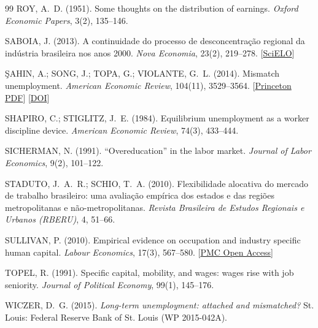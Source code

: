 \documentclass[11pt,a4paper]{article}
\begin{document}
{\begin{thebibliography}{99}
ROY, A.~D. (1951). Some thoughts on the distribution of earnings. \textit{Oxford Economic Papers}, 3(2), 135--146.

SABOIA, J. (2013). A continuidade do processo de desconcentra\c{c}\~ao regional da ind\'ustria brasileira nos anos 2000. \textit{Nova Economia}, 23(2), 219--278. [\href{https://doi.org/10.1590/S0103-63512013000200001}{SciELO}]

\c{S}AHIN, A.; SONG, J.; TOPA, G.; VIOLANTE, G.~L. (2014). Mismatch unemployment. \textit{American Economic Review}, 104(11), 3529--3564. [\href{https://oar.princeton.edu/rt4ds/file/13928/mismatch+u.pdf}{Princeton PDF}] [\href{https://doi.org/10.1257/aer.104.11.3529}{DOI}]

SHAPIRO, C.; STIGLITZ, J.~E. (1984). Equilibrium unemployment as a worker discipline device. \textit{American Economic Review}, 74(3), 433--444.

SICHERMAN, N. (1991). ``Overeducation'' in the labor market. \textit{Journal of Labor Economics}, 9(2), 101--122.

STADUTO, J.~A.~R.; SCHIO, T.~A. (2010). Flexibilidade alocativa do mercado de trabalho brasileiro: uma avalia\c{c}\~ao emp\'irica dos estados e das regi\~oes metropolitanas e n\~ao-metropolitanas. \textit{Revista Brasileira de Estudos Regionais e Urbanos (RBERU)}, 4, 51--66.

SULLIVAN, P. (2010). Empirical evidence on occupation and industry specific human capital. \textit{Labour Economics}, 17(3), 567--580. [\href{https://pmc.ncbi.nlm.nih.gov/articles/PMC2879094/}{PMC Open Access}]

TOPEL, R. (1991). Specific capital, mobility, and wages: wages rise with job seniority. \textit{Journal of Political Economy}, 99(1), 145--176.

WICZER, D.~G. (2015). \textit{Long-term unemployment: attached and mismatched?} St. Louis: Federal Reserve Bank of St. Louis (WP 2015-042A).

\end{thebibliography}}

\clearpage
\appendix
\renewcommand{\thetable}{A\arabic{table}}
\renewcommand{\thefigure}{A\arabic{figure}}
\setcounter{table}{0}
\setcounter{figure}{0}
\end{document}
